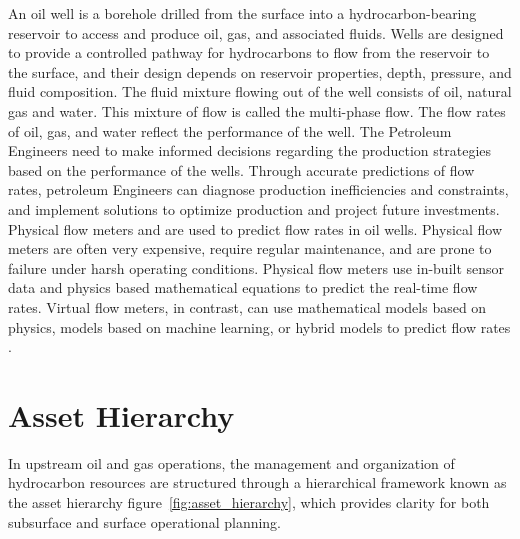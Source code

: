 \documentclass[12pt,APA]{uomthesis}
\begin{document}
An oil well is a borehole drilled from the surface into a hydrocarbon-bearing reservoir to access and produce oil, gas, and associated fluids. Wells are designed to provide a controlled pathway for hydrocarbons to flow from the reservoir to the surface, and their design depends on reservoir properties, depth, pressure, and fluid composition. The fluid mixture flowing out of the well consists of oil, natural gas and water. This mixture of flow is called the multi-phase flow. The flow rates of oil, gas, and water reflect the performance of the well. The Petroleum Engineers need to make informed decisions regarding the production strategies based on the performance of the wells. Through accurate predictions of flow rates, petroleum Engineers can diagnose production inefficiencies and constraints, and implement solutions to optimize production and project future investments. Physical flow meters and  are used to predict flow rates in oil wells. Physical flow meters are often very expensive, require regular maintenance, and are prone to failure under harsh operating conditions. Physical flow meters use in-built sensor data and physics based mathematical equations to predict the real-time flow rates. Virtual flow meters, in contrast, can use mathematical models based on physics, models based on machine learning, or hybrid models to predict flow rates \citep{bikmukhametov2020first}. 

\section{Asset Hierarchy}
In upstream oil and gas operations, the management and organization of hydrocarbon resources are structured through a hierarchical framework known as the asset hierarchy figure~\ref{fig:asset_hierarchy}, which provides clarity for both subsurface and surface operational planning.
\end{document}
